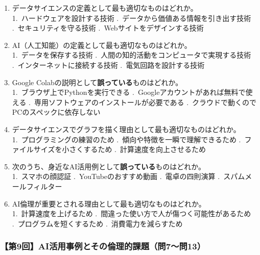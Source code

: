 \documentclass[b4paper,7pt,twocolumn,landscape]{jsarticle}
\begin{document}
\begin{enumerate}
\item データサイエンスの定義として最も適切なものはどれか。\\
1.~ハードウェアを設計する技術 .~データから価値ある情報を引き出す技術 .~セキュリティを守る技術 .~Webサイトをデザインする技術

\item AI（人工知能）の定義として最も適切なものはどれか。\\
1.~データを保存する技術 .~人間の知的活動をコンピュータで実現する技術 .~インターネットに接続する技術 .~電気回路を設計する技術

\item Google Colabの説明として\textbf{誤っている}ものはどれか。\\
1.~ブラウザ上でPythonを実行できる .~Googleアカウントがあれば無料で使える .~専用ソフトウェアのインストールが必要である .~クラウドで動くのでPCのスペックに依存しない

\item データサイエンスでグラフを描く理由として最も適切なものはどれか。\\
1.~プログラミングの練習のため .~傾向や特徴を一瞬で理解できるため .~ファイルサイズを小さくするため .~計算速度を向上させるため

\item 次のうち、身近なAI活用例として\textbf{誤っている}ものはどれか。\\
1.~スマホの顔認証 .~YouTubeのおすすめ動画 .~電卓の四則演算 .~スパムメールフィルター

\item AI倫理が重要とされる理由として最も適切なものはどれか。\\
1.~計算速度を上げるため .~間違った使い方で人が傷つく可能性があるため .~プログラムを短くするため .~消費電力を減らすため
\end{enumerate}

\subsubsection*{【第9回】AI活用事例とその倫理的課題（問7〜問13）}
\end{document}
